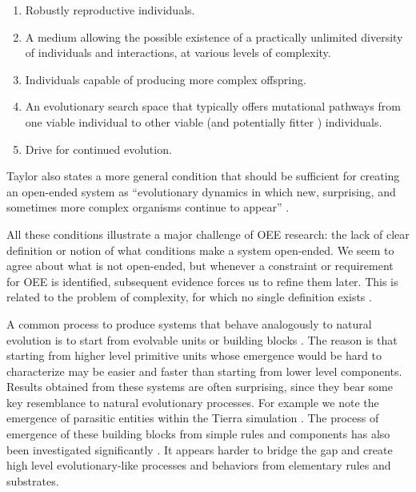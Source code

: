 \begin{enumerate}
  \item Robustly reproductive individuals.
  \item A medium allowing the possible existence of a practically unlimited
        diversity of individuals and interactions, at various levels of
        complexity.
  \item Individuals capable of producing more complex offspring.
  \item An evolutionary search space that typically offers mutational pathways
        from one viable individual to other viable (and potentially fitter )
        individuals.
  \item Drive for continued evolution.
\end{enumerate}
Taylor also states a more general condition that should be sufficient for
creating an open-ended system as ``evolutionary dynamics in which new,
surprising, and sometimes more complex organisms continue to appear''
\parencite{taylorRequirementsOpenEndedEvolution2015,
  taylorOpenEndedEvolutionPerspectives2016}.

All these conditions illustrate a major challenge of \ac{OEE} research: the lack
of clear definition or notion of what conditions make a system open-ended. We
seem to agree about what is not open-ended, but whenever a constraint or
requirement for \ac{OEE} is identified, subsequent evidence forces us to refine
them later. This is related to the problem of complexity, for which no single
definition exists \parencite{johnsonSimplyComplexityClear2009}.

A common process to produce systems that behave analogously to natural evolution
is to start from evolvable units or building blocks
\parencite{srayApproachSynthesisLife1991, simsEvolvingVirtualCreatures1994,
  ofriaAvidaSoftwarePlatform2004, yaegerComputationalGeneticsPhysiology1994,
  channonImprovingStillPassing2003, spectorDivisionBlocksOpenended2007,
  sorosIdentifyingNecessaryConditions2014}. The reason is that starting from
higher level primitive units whose emergence would be hard to characterize may
be easier and faster than starting from lower level components. Results obtained
from these systems are often surprising, since they bear some key resemblance to
natural evolutionary processes. For example we note the emergence of parasitic
entities within the Tierra simulation \parencite{srayApproachSynthesisLife1991}.
The process of emergence of these building blocks from simple rules and
components has also been investigated significantly
\parencite{bagleySpontaneousEmergenceMetabolism1991,
  huttonEvolvableSelfReproducingCells2007, flammEvolutionMetabolicNetworks2010,
  sayamaSeekingOpenendedEvolution2011}. It appears harder to bridge the gap and
create high level evolutionary-like processes and behaviors from elementary
rules and substrates.

